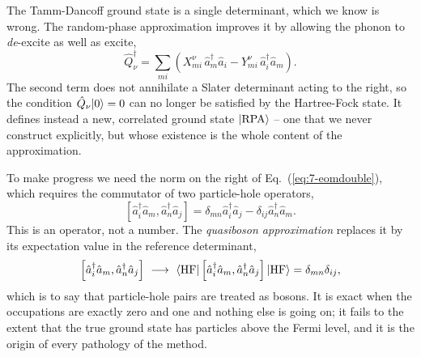 The Tamm-Dancoff ground state is a single determinant, which we know is wrong.
The random-phase approximation improves it by allowing the phonon to
\emph{de}-excite as well as excite,
\begin{equation}
  \hat{Q}^{\dagger}_{\nu} = \sum_{mi}\left(
    X^{\nu}_{mi}\,\hat{a}^{\dagger}_{m}\hat{a}_{i}
    - Y^{\nu}_{mi}\,\hat{a}^{\dagger}_{i}\hat{a}_{m}\right).
  \label{eq:7-rpaoperator}
\end{equation}
The second term does not annihilate a Slater determinant acting to the right,
so the condition $\hat{Q}_{\nu}\vert 0 \rangle=0$ can no longer be satisfied by the
Hartree-Fock state.  It defines instead a new, correlated ground state
$\vert \mathrm{RPA} \rangle$ -- one that we never construct explicitly, but whose
existence is the whole content of the approximation.

To make progress we need the norm on the right of
Eq.~(\ref{eq:7-eomdouble}), which requires the commutator of two
particle-hole operators,
\begin{equation}
  \left[\hat{a}^{\dagger}_{i}\hat{a}_{m},
    \hat{a}^{\dagger}_{n}\hat{a}_{j}\right]
   = \delta_{mn}\hat{a}^{\dagger}_{i}\hat{a}_{j}
   - \delta_{ij}\hat{a}^{\dagger}_{n}\hat{a}_{m}.
  \label{eq:7-phcommutator}
\end{equation}
This is an operator, not a number.  The \emph{quasiboson approximation}
replaces it by its expectation value in the reference determinant,
\begin{equation}
  \left[\hat{a}^{\dagger}_{i}\hat{a}_{m},
    \hat{a}^{\dagger}_{n}\hat{a}_{j}\right]
  \ \longrightarrow\
  \langle \mathrm{HF} | \left[\hat{a}^{\dagger}_{i}\hat{a}_{m},
    \hat{a}^{\dagger}_{n}\hat{a}_{j}\right] | \mathrm{HF} \rangle
   = \delta_{mn}\delta_{ij},
  \label{eq:7-quasiboson}
\end{equation}
which is to say that particle-hole pairs are treated as bosons.  It is exact
when the occupations are exactly zero and one and nothing else is going on;
it fails to the extent that the true ground state has particles above the
Fermi level, and it is the origin of every pathology of the method.

